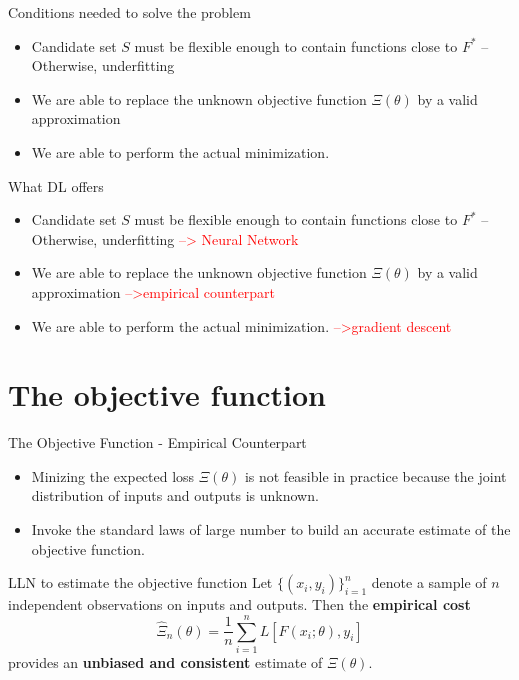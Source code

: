 \documentclass[aspectratio=169]{beamer} %
\begin{document}
\begin{frame}{Conditions needed to solve the problem }
\begin{itemize}
    \item Candidate set $S$ must be flexible enough to contain functions close to $F^*$ -- Otherwise, underfitting
    \item We are able to replace the unknown objective function $\Xi(\theta)$ by a valid approximation 
    \item We are able to perform the actual minimization.
\end{itemize}
    
\end{frame}

\begin{frame}{What DL offers}

\begin{itemize}
    \item Candidate set $S$ must be flexible enough to contain functions close to $F^*$ -- Otherwise, underfitting \textcolor{red}{--> Neural Network}
    \item We are able to replace the unknown objective function $\Xi(\theta)$ by a valid approximation \textcolor{red}{-->empirical counterpart}
    \item We are able to perform the actual minimization. \textcolor{red}{-->gradient descent}
\end{itemize}

\end{frame}

\section{The objective function}

\begin{frame}{The Objective Function - Empirical Counterpart}
\begin{itemize}
    \item Minizing the expected loss $\Xi(\theta)$ is not feasible in practice because the joint distribution of inputs and outputs is unknown.
    \item Invoke the standard laws of large number to build an accurate estimate of the objective function. 
\end{itemize}
    
\end{frame}

\begin{frame}{LLN to estimate the objective function}
    Let $\{(x_i,y_i)\}_{i=1}^n$ denote a sample of $n$ independent observations on inputs and outputs. Then the \textbf{empirical cost}
    $$
    \widehat{\Xi}_n(\theta) = \frac{1}{n}\sum_{i=1}^n L[F(x_i;\theta),y_i]
    $$
    provides an \textbf{unbiased and consistent} estimate of $\Xi(\theta)$.
\end{frame}
\end{document}
